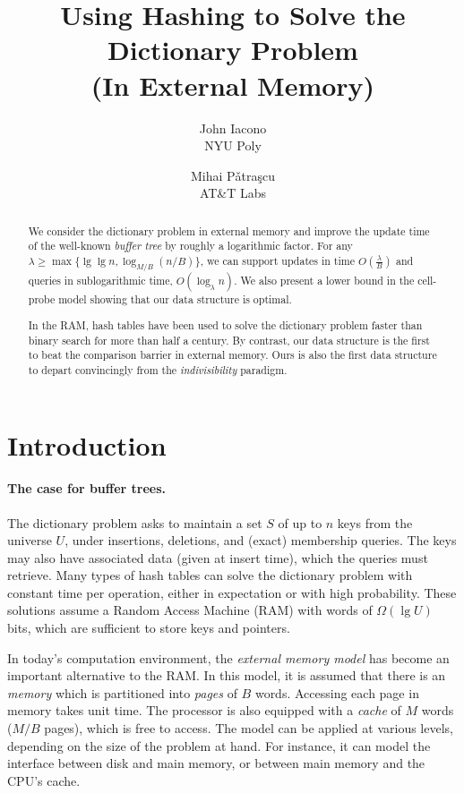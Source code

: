 \documentclass[letterpaper,11pt]{article}
\title{Using Hashing to Solve the Dictionary Problem \\(In External Memory)}
\author{
     John Iacono \\ NYU Poly
\and Mihai P\v{a}tra\c{s}cu \\ AT\&T Labs
}
\begin{document}
\maketitle

\begin{abstract}
We consider the dictionary problem in external memory and improve the
update time of the well-known \emph{buffer tree} by roughly a
logarithmic factor. For any $\lambda \ge \max \{ \lg\lg n, \log_{M/B}
(n/B) \}$, we can support updates in time $O(\frac{\lambda}{B})$ and
queries in sublogarithmic time, $O(\log_\lambda n)$. We also present a
lower bound in the cell-probe model showing that our data structure is
optimal.

In the RAM, hash tables have been used to solve the dictionary problem
faster than binary search for more than half a century. By contrast,
our data structure is the first to beat the comparison barrier in
external memory. Ours is also the first data structure to depart
convincingly from the \emph{indivisibility} paradigm.
\end{abstract}

\thispagestyle{empty}
\setcounter{page}{0}
\clearpage


\section{Introduction}

\paragraph{The case for buffer trees.}
The dictionary problem asks to maintain a set $S$ of up to $n$ keys
from the universe $U$, under insertions, deletions, and (exact) membership
queries. The keys may also have associated data (given at insert
time), which the queries must retrieve. Many types of hash tables can
solve the dictionary problem with constant time per operation, either
in expectation or with high probability. These solutions assume a
Random Access Machine (RAM) with words of $\Omega(\lg U)$ bits, which are
sufficient to store keys and pointers.

In today's computation environment, the \emph{external memory model} has
become an important alternative to the RAM. In this
model, it is assumed that there is an \emph{memory} which is partitioned into \emph{pages} of $B$ words. 
Accessing each page in memory takes unit time.  The
processor is also equipped with a \emph{cache} of $M$ words ($M/B$ pages),
which is free to access. The model can be applied at various levels,
depending on the size of the problem at hand. For instance, it can
model the interface between disk and main memory, or between main
memory and the CPU's cache.
\end{document}
